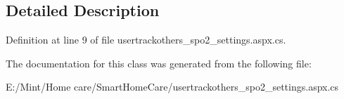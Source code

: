 \subsection{Detailed Description}


Definition at line 9 of file usertrackothers\-\_\-spo2\-\_\-settings.\-aspx.\-cs.



The documentation for this class was generated from the following file\-:\begin{DoxyCompactItemize}
\item 
E\-:/\-Mint/\-Home care/\-Smart\-Home\-Care/usertrackothers\-\_\-spo2\-\_\-settings.\-aspx.\-cs\end{DoxyCompactItemize}
